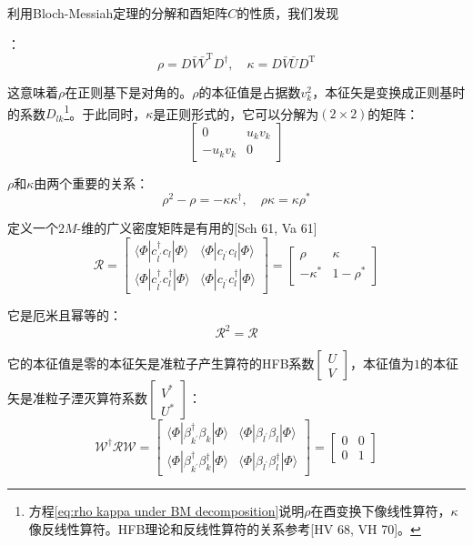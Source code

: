 利用Bloch-Messiah定理的分解和酉矩阵$C$的性质，我们发现

：
\begin{equation}
\rho=D\bar{V}\bar{V}^{\mathrm{T}}D^{\dagger},\quad\kappa=D\bar{V}\bar{U}D^{\mathrm{T}}\label{eq:rho kappa under BM decomposition}
\end{equation}

这意味着$\rho$在正则基下是对角的。$\rho$的本征值是占据数$v^{2}_{k}$，本征矢是变换成正则基时的系数$D_{lk}$\footnote{方程\ref{eq:rho kappa under BM decomposition}说明$\rho$在酉变换下像线性算符，$\kappa$像反线性算符。HFB理论和反线性算符的关系参考{[}HV
68, VH 70{]}。}。于此同时，$\kappa$是正则形式的，它可以分解为$(2\times2)$的矩阵：
\[
\begin{bmatrix}0 & u_{k}v_{k}\\
-u_{k}v_{k} & 0
\end{bmatrix}
\]

$\rho$和$\kappa$由两个重要的关系：
\[
\rho^{2}-\rho=-\kappa\kappa^{\dagger},\quad\rho\kappa=\kappa\rho^{*}
\]

定义一个$2M$-维的广义密度矩阵是有用的{[}Sch 61, Va 61{]}
\[
\mathcal{R}=\begin{bmatrix}\langle\Phi|c^{\dagger}_{l^{\prime}}c_{l}|\Phi\rangle & \langle\Phi|c_{l^{\prime}}c_{l}|\Phi\rangle\\
\langle\Phi|c^{\dagger}_{l^{\prime}}c^{\dagger}_{l}|\Phi\rangle & \langle\Phi|c_{l^{\prime}}c^{\dagger}_{l}|\Phi\rangle
\end{bmatrix}=\begin{bmatrix}\rho & \kappa\\
-\kappa^{*} & 1-\rho^{*}
\end{bmatrix}
\]

它是厄米且幂等的：
\[
\mathcal{R}^{2}=\mathcal{R}
\]

它的本征值是零的本征矢是准粒子产生算符的HFB系数$\left[\begin{smallmatrix}U\\
V
\end{smallmatrix}\right]$，本征值为$1$的本征矢是准粒子湮灭算符系数$\left[\begin{smallmatrix}V^{*}\\
U^{*}
\end{smallmatrix}\right]$：
\[
\mathcal{W}^{\dagger}\mathcal{R}\mathcal{W}=\begin{bmatrix}\langle\Phi|\beta^{\dagger}_{k^{\prime}}\beta_{k}|\Phi\rangle & \langle\Phi|\beta_{l^{\prime}}\beta_{l}|\Phi\rangle\\
\langle\Phi|\beta^{\dagger}_{k^{\prime}}\beta^{\dagger}_{k}|\Phi\rangle & \langle\Phi|\beta_{l^{\prime}}\beta^{\dagger}_{l}|\Phi\rangle
\end{bmatrix}=\begin{bmatrix}0 & 0\\
0 & 1
\end{bmatrix}
\]

